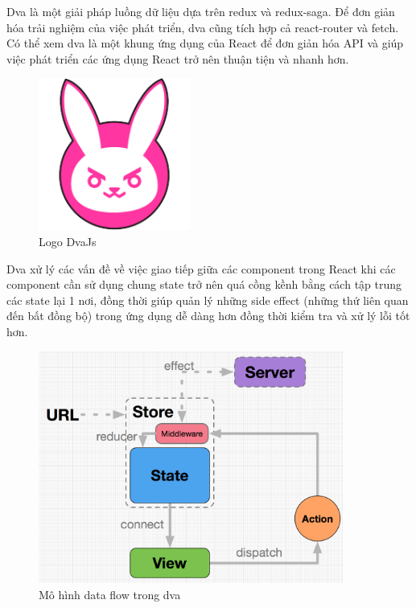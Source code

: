             \hspace*{0.5cm} Dva là một giải pháp luồng dữ liệu dựa trên redux và redux-saga. Để đơn giản hóa trải nghiệm của việc phát triển, dva cũng tích hợp cả react-router và fetch. Có thể xem dva là một khung ứng dụng của React để đơn giản hóa API và giúp việc phát triển các ứng dụng React trở nên thuận tiện và nhanh hơn.\\

            \begin{figure}[!htp]
                \begin{center}
                \includegraphics[width=5cm]{img/Technology/dva.png}
                \end{center}
                \caption{Logo DvaJs \cite{technologyDva}}
            \end{figure}

            Dva xử lý các vấn đề về việc giao tiếp giữa các component trong React khi các component cần sử dụng chung state trở nên quá cồng kềnh bằng cách tập trung các state lại 1 nơi, đồng thời giúp quản lý những side effect (những thứ liên quan đến bất đồng bộ) trong ứng dụng dễ dàng hơn đồng thời kiểm tra và xử lý lỗi tốt hơn.\\

            \begin{figure}[!htp]
                \begin{center}
                \includegraphics[width=10cm]{img/Technology/dva-struct.png}
                \end{center}
                \caption{Mô hình data flow trong dva \cite{technologyDvaAdvance}}
            \end{figure}

